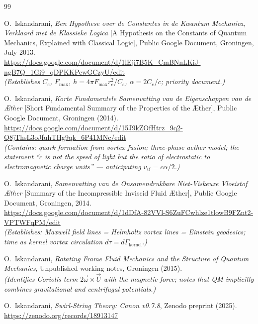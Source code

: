 \documentclass[11pt,a4paper]{article}
\begin{document}
\begin{thebibliography}{99}

O.\ Iskandarani,
\textit{Een Hypothese over de Constantes in de Kwantum Mechanica,
Verklaard met de Klassieke Logica}
[A Hypothesis on the Constants of Quantum Mechanics, Explained with
Classical Logic],
Public Google Document, Groningen, July 2013.\\
\url{https://docs.google.com/document/d/1lEji7B5K_CmBNnLKiJ-ngB7Q_1Gi9_qDPKKPewGCzyU/edit}\\
\textit{(Establishes $C_e$, $F_{\max}$, $h = 4\pi F_{\max}r_c^2/C_e$,
$\alpha = 2C_e/c$; priority document.)}

O.\ Iskandarani,
\textit{Korte Fundamentele Samenvatting van de Eigenschappen van de \AE ther}
[Short Fundamental Summary of the Properties of the \AE ther],
Public Google Document, Groningen (2014).\\
\url{https://docs.google.com/document/d/15J9kZOfHtrz_9q2-Q8jThsL3oJfuhTHg9qk_6P41MNc/edit}\\
\textit{(Contains: quark formation from vortex fusion; three-phase aether model;
the statement ``$c$ is not the speed of light but the ratio of electrostatic
to electromagnetic charge units'' --- anticipating $v_\circlearrowleft = c\alpha/2$.)}

O.\ Iskandarani,
\textit{Samenvatting van de Onsamendrukbare Niet-Viskeuze Vloeistof \AE ther}
[Summary of the Incompressible Inviscid Fluid Æther],
Public Google Document, Groningen, 2014.\\
\url{https://docs.google.com/document/d/1dDfA-82VVl-S6ZuFCwhlze1tlowB9FZnt2-VPTWFqPM/edit}\\
\textit{(Establishes: Maxwell field lines = Helmholtz vortex lines = Einstein
geodesics; time as kernel vortex circulation $d\tau = d\Gamma_\text{kernel}$.)}

O.\ Iskandarani,
\textit{Rotating Frame Fluid Mechanics and the Structure of Quantum Mechanics},
Unpublished working notes, Groningen (2015).\\
\textit{(Identifies Coriolis term $2\vec{\omega}\times\vec{U}$ with the
magnetic force; notes that QM implicitly combines gravitational and centrifugal
potentials.)}

O.\ Iskandarani,
\textit{Swirl-String Theory: Canon v0.7.8},
Zenodo preprint (2025).
\url{https://zenodo.org/records/18913147}


\end{thebibliography}
\end{document}
